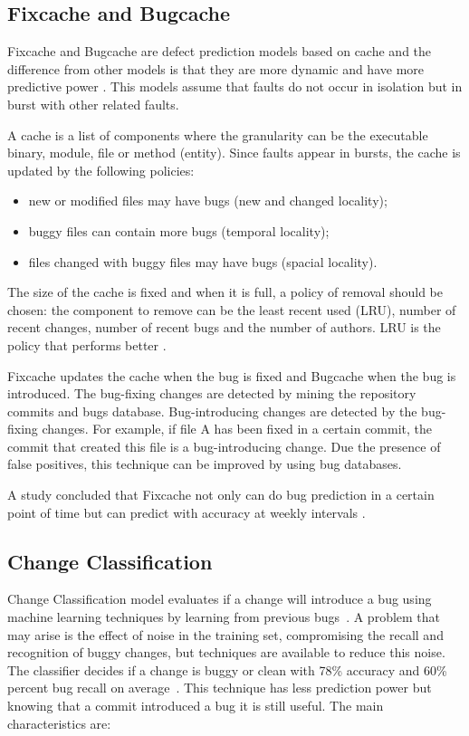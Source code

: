 \subsection{Fixcache and Bugcache}
Fixcache and Bugcache are defect prediction models based on cache and the
difference from other models is that they are more dynamic and have more
predictive power \cite{Kim:2007:PFC:1248820.1248881}. This models assume that
faults do not occur in isolation but in burst with other related faults.

A cache is a list of components where the granularity can be the executable
binary, module, file or method (entity). Since faults appear in bursts, the
cache is updated by the following policies:

\begin{itemize}
  \item new or modified files may have bugs (new and changed locality);
  \item buggy files can contain more bugs (temporal locality);
  \item files changed with buggy files may have bugs (spacial locality).
\end{itemize}

The size of the cache is fixed and when it is full, a policy of removal should
be chosen: the component to remove can be the least recent used (LRU), number
of recent changes, number of recent bugs and the number of authors. LRU is the
policy that performs better \cite{Sadowski2011}.

Fixcache updates the cache when the bug is fixed and Bugcache when the bug is
introduced. The bug-fixing changes are detected by mining the repository commits
and bugs database. Bug-introducing changes are detected by the bug-fixing
changes. For example, if file A has been fixed in a certain commit, the commit
that created this file is a bug-introducing change. Due the presence of false
positives, this technique can be improved by using bug databases.

A study concluded that Fixcache not only can do bug prediction in a certain
point of time but can predict with accuracy at weekly intervals
\cite{Sadowski2011}.

\subsection{Change Classification}
Change Classification model evaluates if a change will introduce a bug using
machine learning techniques by learning from previous bugs~\cite{Kim2008}. A
problem that may arise is the effect of noise in the training set, compromising
the recall and recognition of buggy changes, but techniques are available to
reduce this noise. The classifier decides if a change is buggy or clean with
78\% accuracy and 60\% percent bug recall on average~\cite{Kim2008}. This
technique has less prediction power but knowing that a commit introduced a
bug it is still useful. The main characteristics are:

